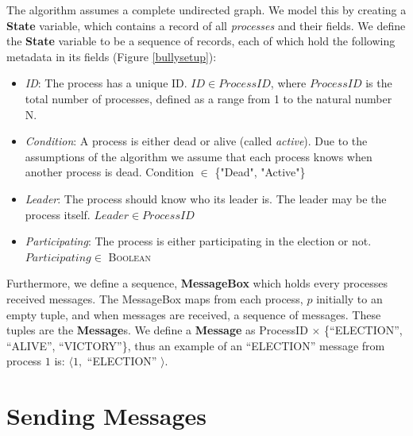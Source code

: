 \documentclass{report}
\newcommand*{\sans}{\fontfamily{lmss}\selectfont}
\begin{document}
The algorithm assumes a complete undirected graph. We model this by creating a \textbf{State} variable, which contains a record of all \textit{processes} and their fields. We define the \textbf{State} variable to be a sequence of records, each of which hold the following metadata in its fields (Figure \ref{bullysetup}):
\begin{itemize}
    \item \textit{ID}: The process has a unique ID. $ID \in ProcessID$, where $ProcessID$ is the total number of processes, defined as a range from 1 to the natural number N.
    \item \textit{Condition}: A process is either dead or alive (called \textit{active}). Due to the assumptions of the algorithm we assume that each process knows when another process is dead. Condition $\in$ \{{\sans"Dead", "Active"}\}
    \item \textit{Leader}: The process should know who its leader is. The leader may be the process itself. $Leader \in ProcessID$
    \item \textit{Participating}: The process is either participating in the election or not. $Participating \in$ {\small \textsc{Boolean}}
\end{itemize}
Furthermore, we define a sequence, \textbf{MessageBox} which holds every processes received messages. The MessageBox maps from each process, $p$ initially to an empty tuple, and when messages are received, a sequence of messages. These tuples are the \textbf{Message}s. We define a \textbf{Message} as ProcessID $\times$ \{{\sans ``ELECTION'', ``ALIVE'', ``VICTORY''}\}, thus an example of an {\sans ``ELECTION''} message from process $1$ is: $\langle1,$ {\sans ``ELECTION''} $\rangle$.

\section{Sending Messages}
\end{document}

